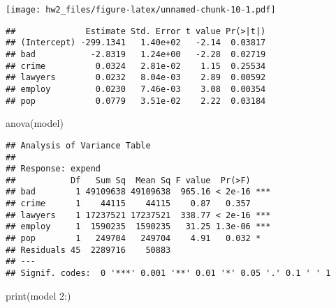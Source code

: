 \documentclass[
  11pt,
]{article}
\newenvironment{Shaded}{\begin{snugshade}}{\end{snugshade}}
\newcommand{\AttributeTok}[1]{\textcolor[rgb]{0.77,0.63,0.00}{#1}}
\newcommand{\FunctionTok}[1]{\textcolor[rgb]{0.00,0.00,0.00}{#1}}
\newcommand{\NormalTok}[1]{#1}
\newcommand{\OtherTok}[1]{\textcolor[rgb]{0.56,0.35,0.01}{#1}}
\newcommand{\SpecialCharTok}[1]{\textcolor[rgb]{0.00,0.00,0.00}{#1}}
\newcommand{\StringTok}[1]{\textcolor[rgb]{0.31,0.60,0.02}{#1}}
\begin{document}
\texttt{[image: hw2\_files/figure-latex/unnamed-chunk-10-1.pdf]}

\begin{Shaded}
\end{Shaded}

\begin{verbatim}
##              Estimate Std. Error t value Pr(>|t|)
## (Intercept) -299.1341   1.40e+02   -2.14  0.03817
## bad           -2.8319   1.24e+00   -2.28  0.02719
## crime          0.0324   2.81e-02    1.15  0.25534
## lawyers        0.0232   8.04e-03    2.89  0.00592
## employ         0.0230   7.46e-03    3.08  0.00354
## pop            0.0779   3.51e-02    2.22  0.03184
\end{verbatim}

\begin{Shaded}
\begin{Highlighting}[]
\FunctionTok{anova}\NormalTok{(model)}
\end{Highlighting}
\end{Shaded}

\begin{verbatim}
## Analysis of Variance Table
## 
## Response: expend
##           Df   Sum Sq  Mean Sq F value  Pr(>F)    
## bad        1 49109638 49109638  965.16 < 2e-16 ***
## crime      1    44115    44115    0.87   0.357    
## lawyers    1 17237521 17237521  338.77 < 2e-16 ***
## employ     1  1590235  1590235   31.25 1.3e-06 ***
## pop        1   249704   249704    4.91   0.032 *  
## Residuals 45  2289716    50883                    
## ---
## Signif. codes:  0 '***' 0.001 '**' 0.01 '*' 0.05 '.' 0.1 ' ' 1
\end{verbatim}

\begin{Shaded}
\begin{Highlighting}[]
\FunctionTok{print}\NormalTok{(}\StringTok{\textquotesingle{}model 2:\textquotesingle{}}\NormalTok{)}
\end{Highlighting}
\end{Shaded}
\end{document}
